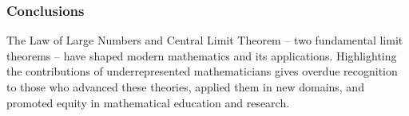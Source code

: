 
\vspace{-1em}
\subsubsection{Conclusions}


The Law of Large Numbers and Central Limit Theorem -- two fundamental limit theorems -- have shaped modern mathematics and its applications. Highlighting the contributions of underrepresented mathematicians gives overdue recognition to those who advanced these theories, applied them in new domains, and promoted equity in mathematical education and research.






